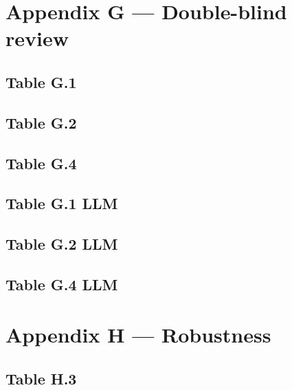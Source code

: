 \documentclass[12pt]{article}
\begin{document}
\section{Appendix G --- Double-blind review}

\subsection{Table G.1}

\clearpage

\subsection{Table G.2}

\clearpage

\subsection{Table G.4}

\clearpage

\subsection{Table G.1 LLM}

\clearpage

\subsection{Table G.2 LLM}

\clearpage

\subsection{Table G.4 LLM}

\clearpage

\section{Appendix H --- Robustness}

\subsection{Table H.3}

\clearpage
\end{document}
